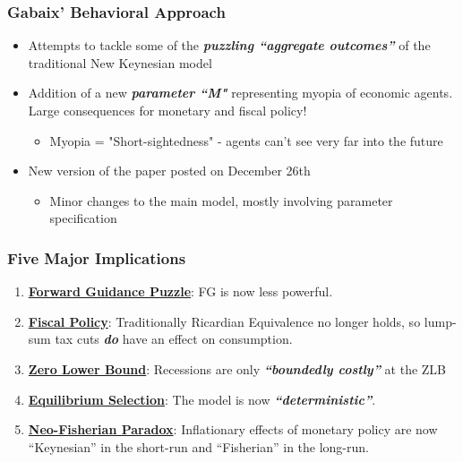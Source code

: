 \documentclass{beamer}
\begin{document}
\begin{frame}
	\frametitle{Gabaix' Behavioral Approach}
	\begin{itemize}
		\item Attempts to tackle some of the \textit{\textbf{puzzling ``aggregate outcomes''}} of the traditional New Keynesian model
		\vspace{8pt}
		\item Addition of a new \textit{\textbf{parameter ``M"}} representing myopia of economic agents. Large consequences for monetary and fiscal policy!
		\vspace{8pt}
		\begin{itemize}
			\item Myopia = "Short-sightedness" - agents can't see very far into the future
		\end{itemize}
		\vspace{5pt}
		\item New version of the paper posted on December 26th
		\begin{itemize}
			\item Minor changes to the main model, mostly involving parameter specification
		\end{itemize}
	\end{itemize}
\end{frame}


\begin{frame}
	\frametitle{Five Major Implications}
	\begin{enumerate}
		\item \textbf{\underline{Forward Guidance Puzzle}}: FG is now less powerful.
		\vspace{8pt}
		\item \textbf{\underline{Fiscal Policy}}: Traditionally Ricardian Equivalence no longer holds, so lump-sum tax cuts \textit{\textbf{do}} have an effect on consumption.
		\item \textbf{\underline{Zero Lower Bound}}: Recessions are only  \textit{\textbf{``boundedly costly''}} at the ZLB
		\item \textbf{\underline{Equilibrium Selection}}: The model is now \textit{\textbf{``deterministic''}}.
		\vspace{8pt}
		\item \underline{\textbf{Neo-Fisherian Paradox}}: Inflationary effects of monetary policy are now ``Keynesian'' in the short-run and ``Fisherian'' in the long-run.
	\end{enumerate}
\end{frame}
\end{document}
